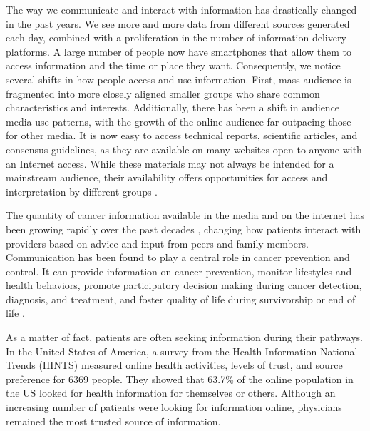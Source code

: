 The way we communicate and interact with information has drastically changed in the past years. We see more and more data from different sources generated each day, combined with a proliferation in the number of information delivery platforms. A large number of people now have smartphones that allow them to access information and the time or place they want. Consequently, we notice several shifts in how people access and use information. First, mass audience is fragmented into more closely aligned smaller groups who share common characteristics and interests. Additionally, there has been a shift in audience media use patterns, with the growth of the online audience far outpacing those for other media. It is now easy to access technical reports, scientific articles, and consensus guidelines, as they are available on many websites open to anyone with an Internet access. While these materials may not always be intended for a mainstream audience, their availability offers opportunities for access and interpretation by different groups \cite{viswanath_communications_2012}.

The quantity of cancer information available in the media and on the internet has been growing rapidly over the past decades \cite{viswanath_science_2005,viswanath_communications_2012}, changing how patients interact with providers based on advice and input from peers and family members. Communication has been found to play a central role in cancer prevention and control. It can provide information on cancer prevention, monitor lifestyles and health behaviors, promote participatory decision making during cancer detection, diagnosis, and treatment, and foster quality of life during survivorship or end of life  \cite{viswanath_communications_2012}.

As a matter of fact, patients are often seeking information during their pathways. In the United States of America, a survey from the Health Information National Trends (HINTS) \cite{hesse_trust_2005} measured online health activities, levels of trust, and source preference for 6369 people. They showed that 63.7\% of the online population in the US looked for health information for themselves or others. Although an increasing number of patients were looking for information online, physicians remained the most trusted source of information.

